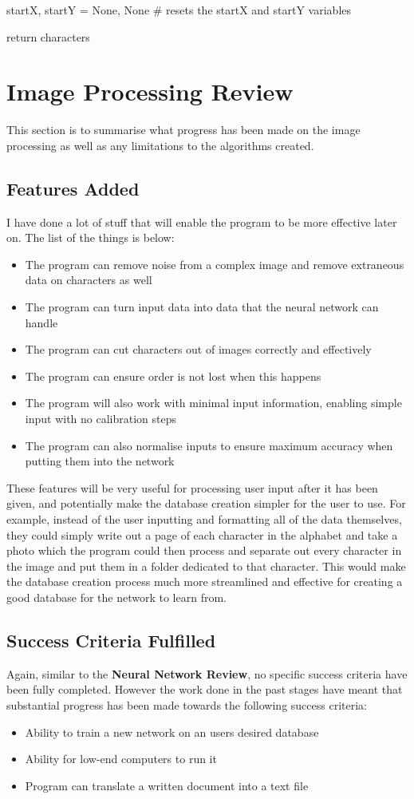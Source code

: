 \documentclass{report}
\begin{document}
\begin{python}
        startX, startY = None, None  # resets the startX and startY variables
    
    return characters
\end{python}
\newpage
\section{Image Processing Review}
This section is to summarise what progress has been made on the image processing as well as any limitations to the algorithms created.
\subsection{Features Added}
I have done a lot of stuff that will enable the program to be more effective later on. The list of the things is below:
\begin{itemize}
    \item The program can remove noise from a complex image and remove extraneous data on characters as well
    \item The program can turn input data into data that the neural network can handle
    \item The program can cut characters out of images correctly and effectively
    \item The program can ensure order is not lost when this happens
    \item The program will also work with minimal input information, enabling simple input with no calibration steps
    \item The program can also normalise inputs to ensure maximum accuracy when putting them into the network
\end{itemize}
These features will be very useful for processing user input after it has been given, and potentially make the database creation simpler for the user to use. For example, instead of the user inputting and formatting all of the data themselves, they could simply write out a page of each character in the alphabet and take a photo which the program could then process and separate out every character in the image and put them in a folder dedicated to that character. This would make the database creation process much more streamlined and effective for creating a good database for the network to learn from.
\subsection{Success Criteria Fulfilled}
Again, similar to the \textbf{Neural Network Review}, no specific success criteria have been fully completed. However the work done in the past stages have meant that substantial progress has been made towards the following success criteria:
\begin{itemize}
    \item Ability to train a new network on an users desired database
    \item Ability for low-end computers to run it
    \item Program can translate a written document into a text file
\end{itemize}
\end{document}
